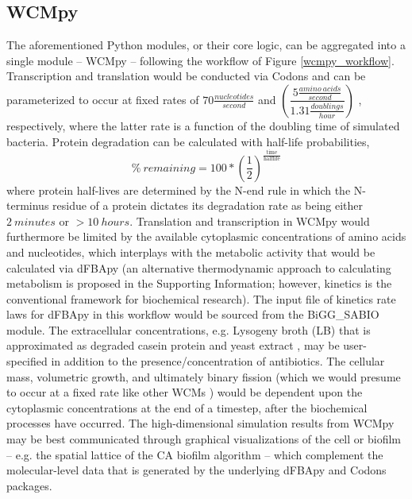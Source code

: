 \subsection{WCMpy}
The aforementioned Python modules, or their core logic, can be aggregated into a single module -- WCMpy -- following the workflow of Figure \ref{wcmpy_workflow}. Transcription and translation would be conducted via Codons and can be parameterized to occur at fixed rates of $70 \frac{nucleotides}{second}$ \cite{Dennis2009VaryingColi,Vogel1995EffectsColi} and $\left(\dfrac{5 \frac{amino~acids}{second}}{1.31 \frac{doublings}{hour}}\right)$ \cite{Young1976PolypeptideRate}, respectively, where the latter rate is a function of the doubling time of simulated bacteria. Protein degradation can be calculated with half-life probabilities, 
\begin{equation} \label{protein_halflife}
    \% ~remaining = 100*\left(\dfrac{1}{2}\right)^{\frac{\text{time}}{\text{halflife}}}
\end{equation} 
where protein half-lives are determined by the N-end rule \cite{Tobias1991TheBacteria} in which the N-terminus residue of a protein dictates its degradation rate as being either $2~minutes$ or $>10~hours$. Translation and transcription in WCMpy would furthermore be limited by the available cytoplasmic concentrations of amino acids and nucleotides, which interplays with the metabolic activity that would be calculated via dFBApy (an alternative thermodynamic approach to calculating metabolism is proposed in the Supporting Information; however, kinetics is the conventional framework for biochemical research). The input file of kinetics rate laws for dFBApy in this workflow would be sourced from the BiGG\_SABIO module. The extracellular concentrations, e.g. Lysogeny broth (LB) \cite{LysogenyBroth} that is approximated as degraded casein protein \cite{Jolles1962AminoPara--casein} and yeast extract \cite{YeastSpread}, may be user-specified in addition to the presence/concentration of antibiotics. The cellular mass, volumetric growth, and ultimately binary fission \cite{Donachie1968RelationshipReplication} (which we would presume to occur at a fixed rate like other WCMs \cite{Karr2012}) would be dependent upon the cytoplasmic concentrations at the end of a timestep, after the biochemical processes have occurred. The high-dimensional simulation results from WCMpy may be best communicated through graphical visualizations of the cell or biofilm -- e.g. the spatial lattice of the CA biofilm algorithm -- which complement the molecular-level data that is generated by the underlying dFBApy and Codons packages. 

